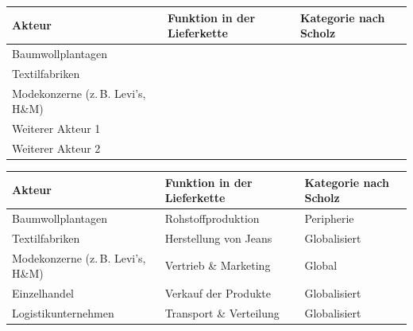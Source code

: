 \begin{myexercise}
    \begin{table}[H]
        \centering
        \small
        \begin{tabular}{p{4cm}||p{6cm}|p{4cm}}
            \textbf{Akteur}                   & \textbf{Funktion in der Lieferkette} & \textbf{Kategorie nach Scholz } \\
            \midrule\midrule
            Baumwollplantagen                 &                                      &                                 \\[1cm]\midrule
            Textilfabriken                    &                                      &                                 \\[1cm]\midrule
            Modekonzerne (z. B. Levi's, H\&M) &                                      &                                 \\[1cm]\midrule
            Weiterer Akteur 1                 &                                      &                                 \\[1cm]\midrule
            Weiterer Akteur 2                 &                                      &                                 \\[1cm]
        \end{tabular}
    \end{table}
    \begin{myanswer}
        \begin{table}[H]
            \small
            \centering
            \begin{tabular}{p{4cm}||p{5cm}|p{3cm}}
                \textbf{Akteur}                     & \textbf{Funktion in der Lieferkette} & \textbf{Kategorie nach Scholz } \\
                \midrule\midrule
                Baumwollplantagen                   & Rohstoffproduktion                   & Peripherie                      \\\midrule
                Textilfabriken                      & Herstellung von Jeans                & Globalisiert                    \\\midrule
                Modekonzerne (z. B. Levi's, H\&M)   & Vertrieb \& Marketing                & Global                          \\\midrule
                Einzelhandel                        & Verkauf der Produkte                 & Globalisiert                    \\\midrule
                Logistikunternehmen                 & Transport \& Verteilung              & Globalisiert                    \\\midrule

\end{tabular}
\end{table}
\end{myanswer}
\end{myexercise}
